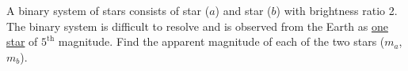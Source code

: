A binary system of stars consists of star ($a$) and star ($b$) with
brightness ratio 2. The binary system is difficult to resolve and is
observed from the Earth as \underline{one star} of $5^{\mathrm{th}}$
magnitude. Find the apparent magnitude of each of the two stars
($m_a$, $m_b$).
